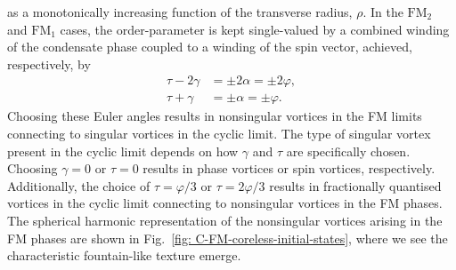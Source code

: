 as a monotonically increasing function of the transverse radius, \(\rho\).
In the \(\text{FM}_2\) and \(\text{FM}_1\) cases, the order-parameter is kept
single-valued by a combined winding of the condensate phase coupled to a winding
of the spin vector, achieved, respectively, by
\begin{align}\label{eq: coreless-euler-limits-FM-2}
    \tau - 2\gamma &= \pm 2\alpha = \pm 2\varphi, \\
    \tau + \gamma &= \pm\alpha=\pm\varphi.\label{eq: coreless-euler-limits-FM-1}
\end{align}
Choosing these Euler angles results in nonsingular vortices in the FM limits
connecting to singular vortices in the cyclic limit.
The type of singular vortex present in the cyclic limit depends on how
\(\gamma\) and \(\tau\) are specifically chosen.
Choosing \(\gamma = 0 \) or \(\tau = 0\) results in phase vortices or spin
vortices, respectively.
Additionally, the choice of \(\tau=\varphi/3\) or \(\tau=2\varphi/3\) results
in fractionally quantised vortices in the cyclic limit connecting to nonsingular
vortices in the FM phases.
The spherical harmonic representation of the nonsingular vortices arising in the
FM phases are shown in Fig.~\ref{fig: C-FM-coreless-initial-states}, where we
see the characteristic fountain-like texture emerge.
